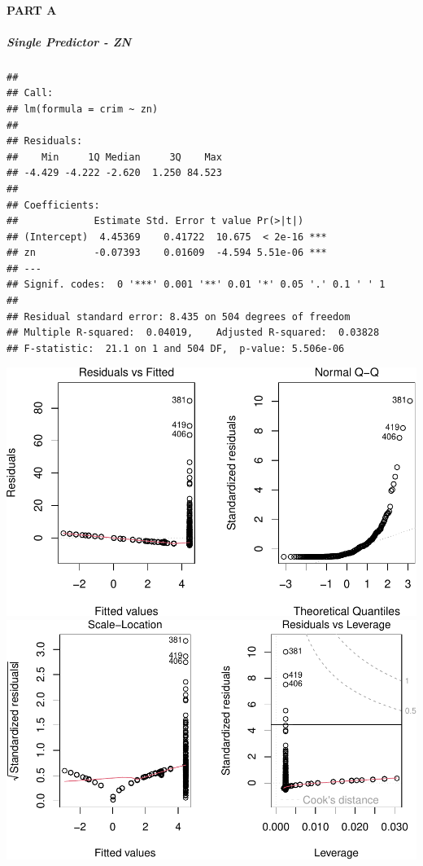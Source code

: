 \documentclass[
]{article}
\begin{document}
\hypertarget{part-a-1}{%
\paragraph{PART A}\label{part-a-1}}

\hypertarget{single-predictor---zn}{%
\subparagraph{\texorpdfstring{\textbf{Single Predictor -
ZN}}{Single Predictor - ZN}}\label{single-predictor---zn}}

\begin{verbatim}
## 
## Call:
## lm(formula = crim ~ zn)
## 
## Residuals:
##    Min     1Q Median     3Q    Max 
## -4.429 -4.222 -2.620  1.250 84.523 
## 
## Coefficients:
##             Estimate Std. Error t value Pr(>|t|)    
## (Intercept)  4.45369    0.41722  10.675  < 2e-16 ***
## zn          -0.07393    0.01609  -4.594 5.51e-06 ***
## ---
## Signif. codes:  0 '***' 0.001 '**' 0.01 '*' 0.05 '.' 0.1 ' ' 1
## 
## Residual standard error: 8.435 on 504 degrees of freedom
## Multiple R-squared:  0.04019,    Adjusted R-squared:  0.03828 
## F-statistic:  21.1 on 1 and 504 DF,  p-value: 5.506e-06
\end{verbatim}

\includegraphics{Disha_Gandhi_Take_Home_Exam_PDF_files/figure-latex/unnamed-chunk-18-1.pdf}
\includegraphics{Disha_Gandhi_Take_Home_Exam_PDF_files/figure-latex/unnamed-chunk-18-2.pdf}
\end{document}
